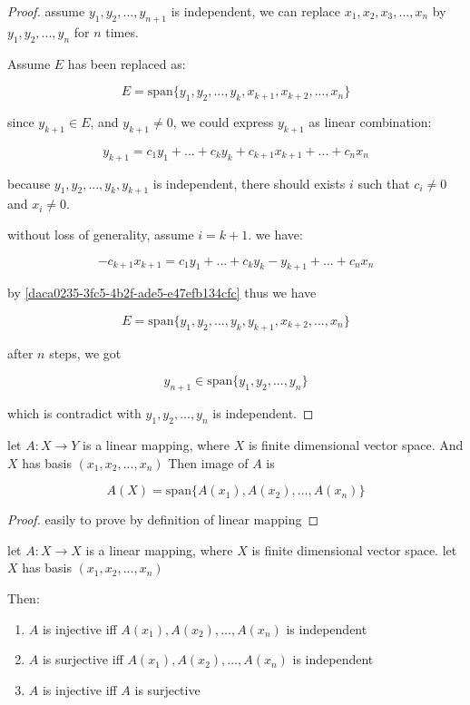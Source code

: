 \begin{proof}
   assume $y_1,y_2,...,y_{n+1}$  is independent, we can replace $x_1,x_2,x_3,...,x_n$ by $y_1,y_2,...,y_n$ for $n$ times.

   Assume $E$ has been replaced as:

   \[
        E = \mathrm{span}\{ y_1,y_2,...,y_k, x_{k+1},x_{k+2},...,x_n\}
   \]

   since $y_{k+1} \in E$, and $y_{k+1} \ne 0$, we could express $y_{k+1}$ as linear combination:

   \[
    y_{k+1} = c_1y_1 + ... + c_ky_k + c_{k+1}x_{k+1} + ... + c_nx_n
   \]

   because $y_1,y_2,...,y_k,y_{k+1}$ is independent, there should exists $i$ such that $c_i \ne 0$ and $x_i \ne 0$.

   without loss of generality, assume $i=k+1$. we have:

   \[
    -c_{k+1}x_{k+1} = c_1y_1 + ... + c_ky_k -y_{k+1} + ... + c_nx_n
   \]

   by \autoref{daca0235-3fc5-4b2f-ade5-e47efb134cfc} thus we have

   \[
    E = \mathrm{span}\{ y_1,y_2,...,y_k, y_{k+1},x_{k+2},...,x_n\}
   \]

   after $n$ steps, we got

   \[
        y_{n+1} \in \mathrm{span}\{ y_1,y_2,...,y_n\}
   \]

   which is contradict with $y_1,y_2,...,y_n$ is independent.
\end{proof}

\begin{thm}
    let $A: X \to Y$ is a linear mapping, where $X$ is finite dimensional vector space. 
    And $X$ has basis $(x_1,x_2,...,x_n)$
    Then image of $A$ is

    \[
        A(X) = \mathrm{span} \{ A(x_1), A(x_2), ..., A(x_n)\}
    \]
\end{thm}

\begin{proof}
    easily to prove by definition of linear mapping
\end{proof}


\begin{thm}
    let $A: X \to X$ is a linear mapping, where $X$ is finite dimensional vector space. 
    let $X$ has basis $(x_1,x_2,...,x_n)$

    Then:

    \begin{enumerate}
        \item $A$ is injective iff $A(x_1), A(x_2), ..., A(x_n)$ is independent
        \item $A$ is surjective iff $A(x_1), A(x_2), ..., A(x_n)$ is independent
        \item $A$ is injective iff $A$ is surjective
    \end{enumerate}
\end{thm}

